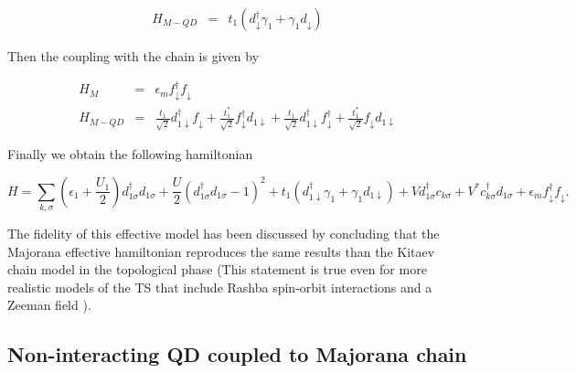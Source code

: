 \begin{eqnarray}
H_{M-QD} & = &  t_1 \left(d_{\downarrow}^{\dagger}\gamma_{1}+\gamma_{1}d_{\downarrow}\right) 
\label{eq:MajoranaCoupling}
\end{eqnarray}





Then the coupling with the chain is given by 

\begin{eqnarray*}
H_{M} & = & \epsilon_{m}f_{\downarrow}^{\dagger}f_{\downarrow}\\
H_{M-QD}&=&\frac{t_1}{\sqrt{2}}d_{1\downarrow}^{\dagger}f_{\downarrow}+\frac{t_1^{*}}{\sqrt{2}}f_{\downarrow}^{\dagger}d_{1\downarrow}+\frac{t_1}{\sqrt{2}}d_{1\downarrow}^{\dagger}f_{\downarrow}^{\dagger}+\frac{t_1^{*}}{\sqrt{2}}f_{\downarrow}d_{1\downarrow}
\end{eqnarray*}

Finally we obtain the following hamiltonian

\begin{equation}
H =\sum_{k,\sigma}\left(\epsilon_1+\frac{U_1}{2}\right)d_{1\sigma}^{\dagger}d_{1\sigma}+ \frac{U}{2}(d_{1\sigma}^{\dagger}d_{1\sigma}-1)^{2} + t_1 \left(d_{1\downarrow}^{\dagger}\gamma_{1}+\gamma_{1}d_{1\downarrow}\right) + Vd^\dagger_{1\sigma}c_{k\sigma}+V^* c^\dagger_{k\sigma}d_{1\sigma}+ \epsilon_{m}f_{\downarrow}^{\dagger}f_{\downarrow}.
\label{eq:QD-Mham}
\end{equation}


The fidelity of this effective model has been discussed by \citet{ruiz-tijerina_interaction_2015}
concluding that the Majorana effective hamiltonian reproduces the
same results than the Kitaev chain model in the topological phase
(This statement is true even for more realistic models of the TS that
include Rashba spin-orbit interactions and a Zeeman field \citep{ruiz-tijerina_interaction_2015}
).\\


\subsection{Non-interacting QD coupled to  Majorana chain \label{sec:GreenMaj-DQD}}

